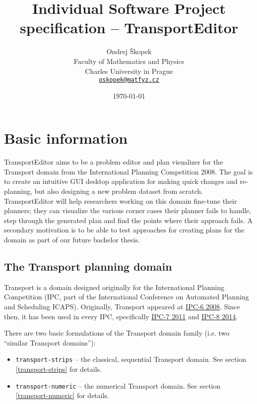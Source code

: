\documentclass[10pt,a4paper,oneside]{article}
\author{Ondrej Škopek\\
Faculty of Mathematics and Physics\\
Charles University in Prague\\
\texttt{\href{mailto:oskopek@matfyz.cz}{oskopek@matfyz.cz}}}
\title{Individual Software Project specification -- TransportEditor}
\date{\today}
\newcommand{\pname}{TransportEditor} %
\begin{document}
\maketitle











\section{Basic information}

\pname{} aims to be a problem editor and plan visualizer for the Transport domain from the International Planning Competition 2008.
The goal is to create an intuitive GUI desktop application for making quick changes and re-planning, but also designing a new problem dataset from scratch. \pname{} will help researchers working on this domain fine-tune their planners; they can visualize the various corner cases their planner fails to handle, step through the generated plan and find the points where their approach fails.
A secondary motivation is to be able to test approaches for creating plans for the domain as part of our future bachelor thesis.

\subsection{The Transport planning domain} \label{domain-info}

Transport is a domain designed originally for the International Planning Competition (IPC, part of the International Conference on Automated Planning and Scheduling ICAPS).
Originally, Transport appeared at \href{http://icaps-conference.org/ipc2008/deterministic/Domains.html}{IPC-6 2008}.
Since then, it has been used in every IPC, specifically \href{http://www.plg.inf.uc3m.es/ipc2011-deterministic/}{IPC-7 2011}
and \href{https://helios.hud.ac.uk/scommv/IPC-14/}{IPC-8 2014}.

There are two basic formulations of the Transport domain family (i.e. two ``similar Transport domains''):
\begin{itemize}
\item \verb+transport-strips+ -- the classical, sequential Transport domain. See section \ref{transport-strips} for details.
\item \verb+transport-numeric+ -- the numerical Transport domain. See section \ref{transport-numeric} for details.
\end{itemize}
\end{document}
